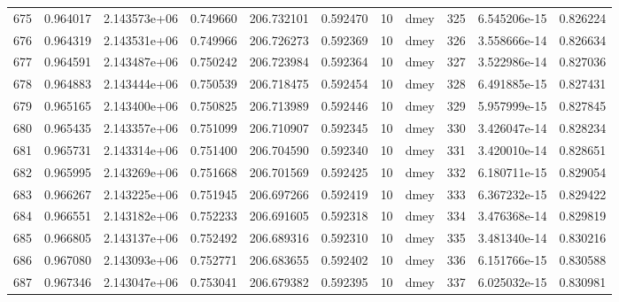 \begin{tabular}{lrrrrrrlrrr}
675  &    0.964017 &        2.143573e+06 &  0.749660 &              206.732101 &    0.592470 &      10 &         dmey &    325 &   6.545206e-15 &      0.826224 \\
676  &    0.964319 &        2.143531e+06 &  0.749966 &              206.726273 &    0.592369 &      10 &         dmey &    326 &   3.558666e-14 &      0.826634 \\
677  &    0.964591 &        2.143487e+06 &  0.750242 &              206.723984 &    0.592364 &      10 &         dmey &    327 &   3.522986e-14 &      0.827036 \\
678  &    0.964883 &        2.143444e+06 &  0.750539 &              206.718475 &    0.592454 &      10 &         dmey &    328 &   6.491885e-15 &      0.827431 \\
679  &    0.965165 &        2.143400e+06 &  0.750825 &              206.713989 &    0.592446 &      10 &         dmey &    329 &   5.957999e-15 &      0.827845 \\
680  &    0.965435 &        2.143357e+06 &  0.751099 &              206.710907 &    0.592345 &      10 &         dmey &    330 &   3.426047e-14 &      0.828234 \\
681  &    0.965731 &        2.143314e+06 &  0.751400 &              206.704590 &    0.592340 &      10 &         dmey &    331 &   3.420010e-14 &      0.828651 \\
682  &    0.965995 &        2.143269e+06 &  0.751668 &              206.701569 &    0.592425 &      10 &         dmey &    332 &   6.180711e-15 &      0.829054 \\
683  &    0.966267 &        2.143225e+06 &  0.751945 &              206.697266 &    0.592419 &      10 &         dmey &    333 &   6.367232e-15 &      0.829422 \\
684  &    0.966551 &        2.143182e+06 &  0.752233 &              206.691605 &    0.592318 &      10 &         dmey &    334 &   3.476368e-14 &      0.829819 \\
685  &    0.966805 &        2.143137e+06 &  0.752492 &              206.689316 &    0.592310 &      10 &         dmey &    335 &   3.481340e-14 &      0.830216 \\
686  &    0.967080 &        2.143093e+06 &  0.752771 &              206.683655 &    0.592402 &      10 &         dmey &    336 &   6.151766e-15 &      0.830588 \\
687  &    0.967346 &        2.143047e+06 &  0.753041 &              206.679382 &    0.592395 &      10 &         dmey &    337 &   6.025032e-15 &      0.830981 \\

\end{tabular}
